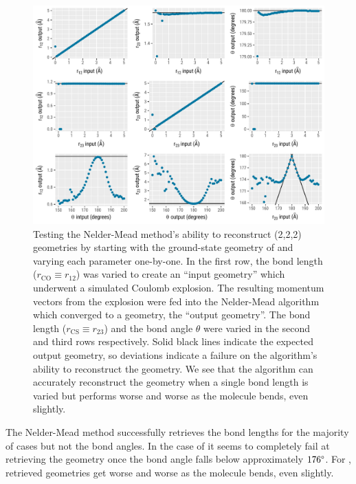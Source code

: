 \begin{figure}
  \centering
  \includegraphics[width=\textwidth]{Plots/OCSSimplexCalibrationPlots}
  \caption[Testing the Nelder-Mead method's ability to reconstruct  (2,2,2) geometries.]
  {Testing the Nelder-Mead method's ability to reconstruct  (2,2,2) geometries by starting with the ground-state geometry of  and varying each parameter one-by-one. In the first row, the  bond length ($r_\textrm{CO}\equiv r_{12}$) was varied to create an ``input geometry'' which underwent a simulated Coulomb explosion. The resulting momentum vectors from the explosion were fed into the Nelder-Mead algorithm which converged to a geometry, the ``output geometry''. The  bond length ($r_\textrm{CS}\equiv r_{23}$) and the bond angle $\theta$ were varied in the second and third rows respectively. Solid black lines indicate the expected output geometry, so deviations indicate a failure on the algorithm's ability to reconstruct the geometry. We see that the algorithm can accurately reconstruct the geometry when a single bond length is varied but performs worse and worse as the molecule bends, even slightly.}
  \label{fig:OCSSimplexCalibrationPlots}
\end{figure}

The Nelder-Mead method successfully retrieves the bond lengths for the majority of cases but not the bond angles. In the case of  it seems to completely fail at retrieving the geometry once the bond angle falls below approximately $176\degree$. For , retrieved geometries get worse and worse as the molecule bends, even slightly.

